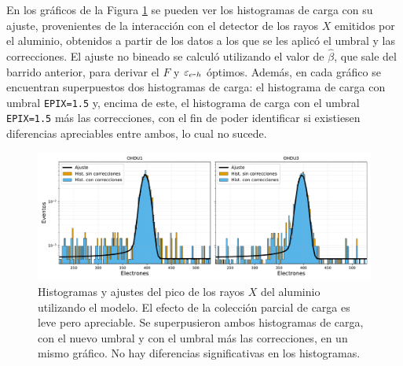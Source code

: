 En los gráficos de la Figura \ref{fig:Al_OHDU1y3_EPIX15_Corr} se pueden ver los histogramas de carga con su ajuste, provenientes de la interacción con el detector de los rayos $X$ emitidos por el aluminio, obtenidos a partir de los datos a los que se les aplicó el umbral y las correcciones. El ajuste no bineado se calculó utilizando el valor de $\hat{\beta}$, que sale del barrido anterior, para derivar el $F$ y $\varepsilon_{e\mbox{-}h}$ óptimos. Además, en cada gráfico se encuentran superpuestos dos histogramas de carga: el histograma de carga con umbral \verb|EPIX=1.5| y, encima de este, el histograma de carga con el umbral \verb|EPIX=1.5| más las correcciones, con el fin de poder identificar si existiesen diferencias apreciables entre ambos, lo cual no sucede.
\begin{figure}[h]
    \centering
        \includegraphics[scale=0.5]{Figs/Al_hists_ohdu1y3_dobles.pdf}
    \caption{Histogramas y ajustes del pico de los rayos $X$ del aluminio utilizando el modelo. El efecto de la colección parcial de carga es leve pero apreciable. Se superpusieron ambos histogramas de carga, con el nuevo umbral y con el umbral más las correcciones, en un mismo gráfico. No hay diferencias significativas en los histogramas.}
    \label{fig:Al_OHDU1y3_EPIX15_Corr}
\end{figure}

